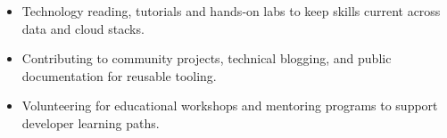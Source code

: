 \begin{itemize}[itemsep=-3pt, left=0pt]
    \item Technology reading, tutorials and hands‑on labs to keep skills current across data and cloud stacks.
    \item Contributing to community projects, technical blogging, and public documentation for reusable tooling.
    \item Volunteering for educational workshops and mentoring programs to support developer learning paths.
\end{itemize}
\vspace{-12pt}

